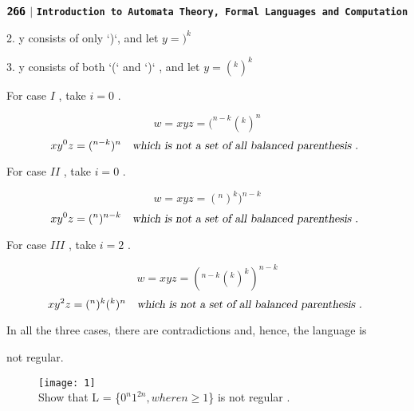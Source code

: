 \documentclass[10pt,a4paper]{article}
\begin{document}
  $\textsf{\textbf{266}}$ $|$ \texttt{\textbf{Introduction to Automata Theory, Formal Languages and Computation}}
\qquad

\footnotesize

2. y consists of only ‘)‘, and let $y =)^{k}$

3. y consists of both ‘(‘ and ‘)‘ , and let $y =(^{k})^{k}$

For case $I$ , take $i = 0$ .

$$ w = xyz = (^{n-k} (^{k} )^{n} $$
$$ xy^{0}z = (^{n-k} )^{n} \quad\textsl{which is not a set of all balanced parenthesis . }$$

For case $II$ , take $i = 0$ .

$$ w = xyz = (^{n} )^{k} )^{n-k} $$
$$ xy^{0}z = (^{n} )^{n-k} \quad\textsl{which is not a set of all balanced parenthesis . }$$

For case $III$ , take $i = 2$ .

$$ w = xyz = (^{n-k} (^{k} )^{k} )^{n-k} $$
$$ xy^{2}z = (^{n} )^{k} (^{k} )^{n} \quad\textsl{which is not a set of all balanced parenthesis . }$$

In all the three cases, there are contradictions and, hence, the language is

\;
 not regular.

\begin{flushleft}
\begin{figure}[h]
  \texttt{[image: 1]}\\Show that L = \{$ 0^{n} 1^{2n} , where n \geq 1 $\} is not regular .
\end{figure}
\end{flushleft}
\end{document}
